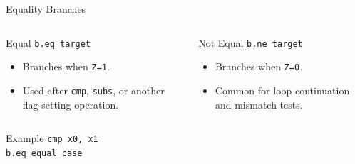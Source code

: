 \documentclass[aspectratio=169,11pt,t]{beamer}
\newcommand{\code}[1]{\texttt{#1}}
\begin{document}
\begin{frame}{Equality Branches}
\begin{columns}[T,onlytextwidth]
\begin{block}{Equal}
\large
\hspace{1.8cm}\code{b.eq target}
\normalsize
\begin{itemize}
\item Branches when \code{Z=1}.
\item Used after \code{cmp}, \code{subs}, or another flag-setting operation.
\end{itemize}
\end{block}
\begin{block}{Not Equal}
\large
\hspace{1.7cm}\code{b.ne target}
\normalsize
\begin{itemize}
\item Branches when \code{Z=0}.
\item Common for loop continuation and mismatch tests.
\end{itemize}
\end{block}
\end{columns}
\vspace{0.25cm}
\begin{block}{Example}
\large
\hspace{3.3cm}\code{cmp x0, x1}\\[0.12cm]
\hspace{3.3cm}\code{b.eq equal\_case}
\normalsize
\end{block}
\end{frame}



\end{document}
